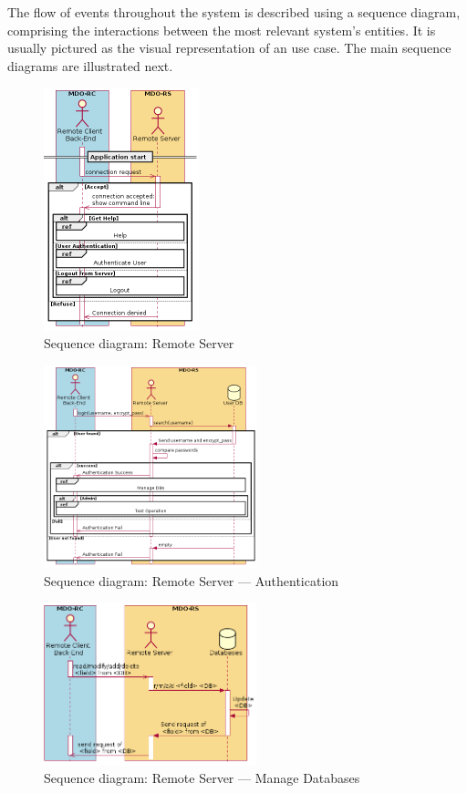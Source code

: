 The flow of events throughout the system is described using a sequence diagram, comprising the interactions between the most relevant system's entities.
It is usually pictured as the visual representation of an use case. The main sequence diagrams are illustrated next.
%
%
\begin{figure}[htb!]
  \centering
  \includegraphics[width=0.4\textwidth]{img/seq-rs-general.png}%
  \caption{Sequence diagram: Remote Server}%
  \label{fig:seq-rs-general}
\end{figure}
%
\begin{figure}[htb!]
  \centering
  \includegraphics[width=0.55\textwidth]{img/seq-rs-authenticate.png}%
  \caption{Sequence diagram: Remote Server --- Authentication}%
  \label{fig:seq-rs-authenticate}
\end{figure}

\begin{figure}[htb!]
  \centering
  \includegraphics[width=0.55\textwidth]{img/seq-rs-manage-dbs.png}%
  \caption{Sequence diagram: Remote Server --- Manage Databases}%
  \label{fig:seq-rs-manage-dbs}
\end{figure}

